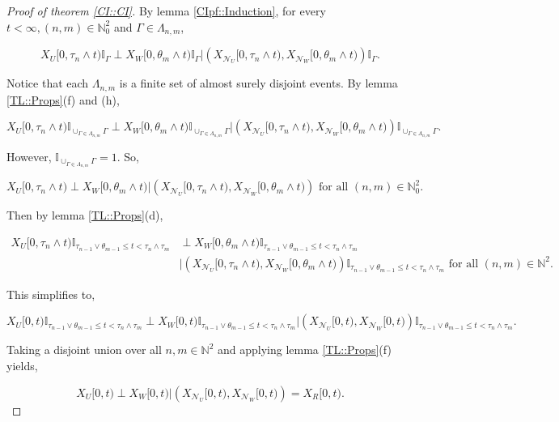\documentclass[12pt]{article}
\newcommand{\mb}{\mathbb}
\newcommand{\mc}{\mathcal}
\newcommand{\te}{\text}
\newcommand{\neigh}[1]{\mc{N}_{#1}}					%
\newcommand{\Xf}{X}									%
\newcommand{\vind}[1]{_{#1}}						%
\newcommand{\tmi}[1]{#1}							%
\newcommand{\seto}{U}								%
\newcommand{\sett}{W}								%
\newcommand{\setc}{R}								%
\newcommand{\rtt}{\theta}							%
\newcommand{\apath}{\Gamma}						%
\newcommand{\pathset}[2]{\Lambda_{#1,#2}}		%
\newcommand{\indo}{n}							%
\newcommand{\indt}{m}							%
\newcommand{\rt}{\tau}								%
\renewcommand{\it}[1]{_{#1}}						%
\begin{document}
\begin{proof}[Proof of theorem \ref{CI::CI}]

By lemma \ref{CIpf::Induction}, for every \(t < \infty, (\indo,\indt) \in \mb{N}_0^2\) and \(\apath \in \pathset{\indo}{\indt}\),

\[\Xf\vind{\seto}\tmi{[0,\rt\it{\indo}\wedge t)}\mb{I}_{\apath}\perp \Xf\vind{\sett}\tmi{[0,\rtt\it{\indt}\wedge t)}\mb{I}_{\apath}|\left(\Xf\vind{\neigh{\seto}}\tmi{[0,\rt\it{\indo}\wedge t)},\Xf\vind{\neigh{\sett}}\tmi{[0,\rtt\it{\indt}\wedge t)}\right)\mb{I}_{\apath}.\]

Notice that each \(\pathset{\indo}{\indt}\) is a finite set of almost surely disjoint events. By lemma \ref{TL::Props}(f) and (h),

\[\Xf\vind{\seto}\tmi{[0,\rt\it{\indo}\wedge t)}\mb{I}_{\cup_{\apath \in \pathset{\indo}{\indt}}\apath}\perp \Xf\vind{\sett}\tmi{[0,\rtt\it{\indt}\wedge t)}\mb{I}_{\cup_{\apath \in \pathset{\indo}{\indt}}\apath}|\left(\Xf\vind{\neigh{\seto}}\tmi{[0,\rt\it{\indo}\wedge t)},\Xf\vind{\neigh{\sett}}\tmi{[0,\rtt\it{\indt}\wedge t)}\right)\mb{I}_{\cup_{\apath \in \pathset{\indo}{\indt}}\apath}.\]

However, \(\mb{I}_{\cup_{\apath \in \pathset{\indo}{\indt}}\apath} = 1\). So, 

\[\Xf\vind{\seto}\tmi{[0,\rt\it{\indo}\wedge t)}\perp \Xf\vind{\sett}\tmi{[0,\rtt\it{\indt}\wedge t)}|\left(\Xf\vind{\neigh{\seto}}\tmi{[0,\rt\it{\indo}\wedge t)},\Xf\vind{\neigh{\sett}}\tmi{[0,\rtt\it{\indt}\wedge t)}\right) \te{ for all } (\indo,\indt)\in\mb{N}_0^2.\]

Then by lemma \ref{TL::Props}(d),

\begin{align*}
\Xf\vind{\seto}\tmi{[0,\rt\it{\indo}\wedge t)}\mb{I}_{\rt\it{\indo-1}\vee\rtt\it{\indt-1} \leq t < \rt\it{\indo}\wedge\rt\it{\indt}}&\perp \Xf\vind{\sett}\tmi{[0,\rtt\it{\indt}\wedge t)}\mb{I}_{\rt\it{\indo-1}\vee\rtt\it{\indt-1} \leq t < \rt\it{\indo}\wedge\rt\it{\indt}}\\
&|\left(\Xf\vind{\neigh{\seto}}\tmi{[0,\rt\it{\indo}\wedge t)},\Xf\vind{\neigh{\sett}}\tmi{[0,\rtt\it{\indt}\wedge t)}\right)\mb{I}_{\rt\it{\indo-1}\vee\rtt\it{\indt-1} \leq t < \rt\it{\indo}\wedge\rt\it{\indt}} \te{ for all } (\indo,\indt)\in\mb{N}^2.
\end{align*}


This simplifies to,

\[\Xf\vind{\seto}\tmi{[0,t)}\mb{I}_{\rt\it{\indo-1}\vee\rtt\it{\indt-1} \leq t < \rt\it{\indo}\wedge\rt\it{\indt}}\perp \Xf\vind{\sett}\tmi{[0,t)}\mb{I}_{\rt\it{\indo-1}\vee\rtt\it{\indt-1} \leq t < \rt\it{\indo}\wedge\rt\it{\indt}}|\left(\Xf\vind{\neigh{\seto}}\tmi{[0,t)},\Xf\vind{\neigh{\sett}}\tmi{[0,t)}\right)\mb{I}_{\rt\it{\indo-1}\vee\rtt\it{\indt-1} \leq t < \rt\it{\indo}\wedge\rt\it{\indt}}.\]

Taking a disjoint union over all \(n,m\in\mb{N}^2\) and applying lemma \ref{TL::Props}(f) yields,

\[\Xf\vind{\seto}\tmi{[0,t)}\perp \Xf\vind{\sett}\tmi{[0,t)}|\left(\Xf\vind{\neigh{\seto}}\tmi{[0,t)},\Xf\vind{\neigh{\sett}}\tmi{[0,t)}\right) = \Xf\vind{\setc}\tmi{[0,t)}.\]
\end{proof}
\end{document}
